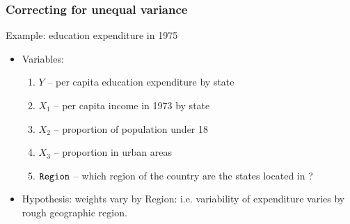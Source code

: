 \documentclass[handout]{beamer}
\begin{document}
   \begin{frame} \frametitle{Correcting for unequal variance}

   \begin{block}
   {Example: education expenditure in 1975                     }
   \begin{itemize}

   \item Variables:
   \begin{enumerate}
   \item $Y$ -- per capita education expenditure by state

   \item $X_1$ -- per capita income in 1973 by state

   \item $X_2$ -- proportion of population under 18

   \item $X_3$ -- proportion in urban areas

   \item ${\tt Region}$ -- which region of the country are the states located in ?
   \end{enumerate}
   \item Hypothesis: weights vary by Region: i.e. variability of expenditure
   varies by rough geographic region.

   \end{itemize}

   \end{block}
   \end{frame}



   \begin{frame}

   \begin{center}
   \end{center}

   \end{frame}

\end{document}
